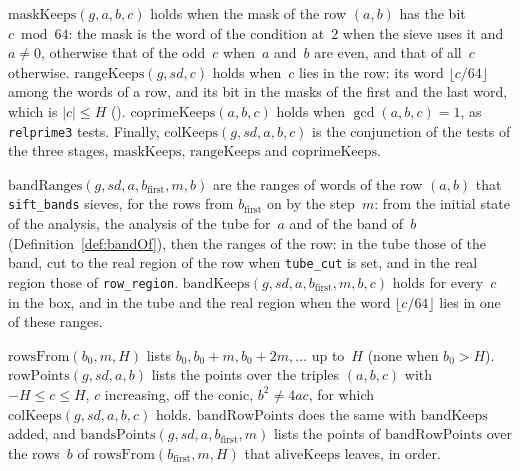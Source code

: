 \begin{definition}\label{def:colKeeps}
  \leanok
  $\mathrm{maskKeeps}(g, a, b, c)$ holds when the mask of the row $(a, b)$ has the bit
  $c \bmod 64$: the mask is the word of the condition at~$2$ when the sieve uses it and $a \ne 0$,
  otherwise that of the odd~$c$ when~$a$ and~$b$ are even, and that of all~$c$ otherwise.
  $\mathrm{rangeKeeps}(g, \mathit{sd}, c)$ holds when~$c$ lies in the row: its word
  $\lfloor c/64 \rfloor$ among the words of a row, and its bit in the masks of the first and the
  last word, which is $|c| \le H$ ().
  $\mathrm{coprimeKeeps}(a, b, c)$ holds when $\gcd(a, b, c) = 1$, as \texttt{relprime3} tests.
  Finally, $\mathrm{colKeeps}(g, \mathit{sd}, a, b, c)$ is the conjunction of the tests of the three
  stages, $\mathrm{maskKeeps}$, $\mathrm{rangeKeeps}$ and $\mathrm{coprimeKeeps}$.
\end{definition}

\begin{definition}\label{def:bandKeeps}
  \leanok
  $\mathrm{bandRanges}(g, \mathit{sd}, a, b_{\mathrm{first}}, m, b)$ are the ranges of words of the
  row $(a, b)$ that \texttt{sift\_bands} sieves, for the rows from $b_{\mathrm{first}}$ on by the
  step~$m$: from the initial state of the analysis, the analysis of the tube for~$a$ and of the band
  of~$b$ (Definition~\ref{def:bandOf}), then the ranges of the row: in the tube those of the band,
  cut to the real region of the row when \texttt{tube\_cut} is set, and in the real region those of
  \texttt{row\_region}.
  $\mathrm{bandKeeps}(g, \mathit{sd}, a, b_{\mathrm{first}}, m, b, c)$ holds for every~$c$ in the
  box, and in the tube and the real region when the word $\lfloor c/64 \rfloor$ lies in one of
  these ranges.
\end{definition}

\begin{definition}\label{def:rowPoints}
  \leanok
  $\mathrm{rowsFrom}(b_0, m, H)$ lists $b_0, b_0 + m, b_0 + 2m, \dots$ up to~$H$ (none when
  $b_0 > H$). $\mathrm{rowPoints}(g, \mathit{sd}, a, b)$ lists the points over the triples
  $(a, b, c)$ with $-H \le c \le H$, $c$ increasing, off the conic, $b^2 \ne 4ac$, for which
  $\mathrm{colKeeps}(g, \mathit{sd}, a, b, c)$ holds. $\mathrm{bandRowPoints}$ does the same with
  $\mathrm{bandKeeps}$ added, and $\mathrm{bandsPoints}(g, \mathit{sd}, a, b_{\mathrm{first}}, m)$
  lists the points of $\mathrm{bandRowPoints}$ over the rows~$b$ of
  $\mathrm{rowsFrom}(b_{\mathrm{first}}, m, H)$ that $\mathrm{aliveKeeps}$ leaves, in order.
\end{definition}

